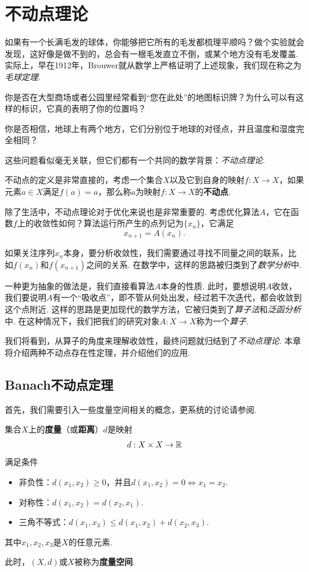 \chapter{不动点理论}\label{chap:fixed-point-theory}

如果有一个长满毛发的球体，你能够把它所有的毛发都梳理平顺吗？做个实验就会发现，这好像是做不到的，总会有一根毛发直立不倒，或某个地方没有毛发覆盖. 实际上，早在1912年，Brouwer就从数学上严格证明了上述现象，我们现在称之为\textit{毛球定理}.

你是否在大型商场或者公园里经常看到“您在此处”的地图标识牌？为什么可以有这样的标识，它真的表明了你的位置吗？

你是否相信，地球上有两个地方，它们分别位于地球的对径点，并且温度和湿度完全相同？

这些问题看似毫无关联，但它们都有一个共同的数学背景：\textit{不动点理论}.

不动点的定义是非常直接的，考虑一个集合$X$以及它到自身的映射$f:X\to X$，如果元素$a\in X$满足$f(a)=a$，那么称$a$为映射$f:X\to X$的\textbf{不动点}. 

除了生活中，不动点理论对于优化来说也是非常重要的. 考虑优化算法$A$，它在函数$f$上的收敛性如何？算法运行所产生的点列记为$\{x_n\}$，它满足
\[x_{n+1}=A(x_n).\] 

如果关注序列$x_n$本身，要分析收敛性，我们需要通过寻找不同量之间的联系，比如$f(x_n)$和$f(x_{n+1})$之间的关系. 在数学中，这样的思路被归类到了\textit{数学分析}中.  

一种更为抽象的做法是，我们直接看算法$A$本身的性质. 此时，要想说明$A$收敛，我们要说明$A$有一个“吸收点”，即不管从何处出发，经过若干次迭代，都会收敛到这个点附近. 这样的思路是更加现代的数学方法，它被归类到了\textit{算子法}和\textit{泛函分析}中. 在这种情况下，我们把我们的研究对象$A:X\to X$称为一个\textit{算子}.

我们将看到，从算子的角度来理解收敛性，最终问题就归结到了\textit{不动点理论}. 本章将介绍两种不动点存在性定理，并介绍他们的应用.

\section{Banach不动点定理}

首先，我们需要引入一些度量空间相关的概念，更系统的讨论请参阅.

\begin{definition}[度量与度量空间]
集合$X$上的\textbf{度量}（或\textbf{距离}）$d$是映射
\[d:X\times X\to \mathbb{R}\]
满足条件
\begin{itemize}
\item 非负性：$d(x_1,x_2)\geq 0$，并且$d(x_1,x_2)=0\iff x_1=x_2$.
\item 对称性：$d(x_1,x_2)=d(x_2,x_1)$.
\item 三角不等式：$d(x_1,x_3)\leq d(x_1,x_2)+d(x_2,x_3)$.
\end{itemize}
其中$x_1,x_2,x_3$是$X$的任意元素. 

此时，$(X,d)$或$X$被称为\textbf{度量空间}.
\end{definition}

